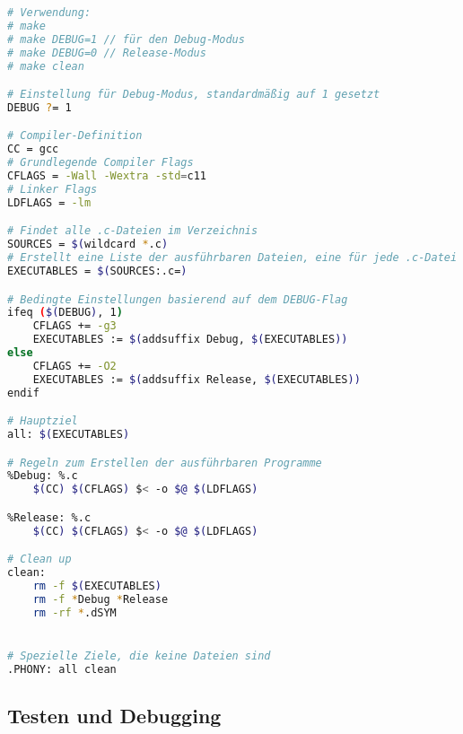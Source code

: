 \documentclass{vorlage-design-main}
\begin{document}
\begin{lstlisting}[language=bash]
# Verwendung:
# make
# make DEBUG=1 // für den Debug-Modus
# make DEBUG=0 // Release-Modus
# make clean

# Einstellung für Debug-Modus, standardmäßig auf 1 gesetzt
DEBUG ?= 1

# Compiler-Definition
CC = gcc
# Grundlegende Compiler Flags
CFLAGS = -Wall -Wextra -std=c11
# Linker Flags
LDFLAGS = -lm

# Findet alle .c-Dateien im Verzeichnis
SOURCES = $(wildcard *.c)
# Erstellt eine Liste der ausführbaren Dateien, eine für jede .c-Datei
EXECUTABLES = $(SOURCES:.c=)

# Bedingte Einstellungen basierend auf dem DEBUG-Flag
ifeq ($(DEBUG), 1)
    CFLAGS += -g3
    EXECUTABLES := $(addsuffix Debug, $(EXECUTABLES))
else
    CFLAGS += -O2
    EXECUTABLES := $(addsuffix Release, $(EXECUTABLES))
endif

# Hauptziel
all: $(EXECUTABLES)

# Regeln zum Erstellen der ausführbaren Programme
%Debug: %.c
    $(CC) $(CFLAGS) $< -o $@ $(LDFLAGS)

%Release: %.c
    $(CC) $(CFLAGS) $< -o $@ $(LDFLAGS)

# Clean up
clean:
    rm -f $(EXECUTABLES)
    rm -f *Debug *Release
    rm -rf *.dSYM


# Spezielle Ziele, die keine Dateien sind
.PHONY: all clean
\end{lstlisting}

\hypertarget{testen-und-debugging}{%
\subsection{Testen und Debugging}\label{testen-und-debugging}}
\end{document}
